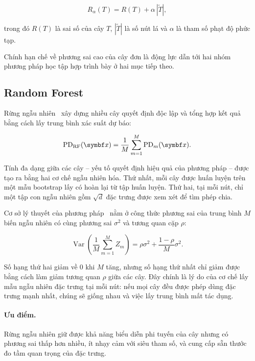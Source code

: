 \begin{equation}
R_\alpha(T) = R(T) + \alpha \, |\tilde{T}|,
\label{eq:ccp}
\end{equation}

trong đó $R(T)$ là sai số của cây $T$, $|\tilde{T}|$ là số nút lá và $\alpha$ là
tham số phạt độ phức tạp.

Chính hạn chế về phương sai cao của cây đơn là động lực dẫn tới hai nhóm phương
pháp học tập hợp trình bày ở hai mục tiếp theo.

\subsection{Random Forest}
\label{subsec:random-forest}

Rừng ngẫu nhiên~\cite{breiman2001} xây dựng nhiều cây quyết định độc lập và tổng
hợp kết quả bằng cách lấy trung bình xác suất dự báo:

\begin{equation}
\PD_{\text{RF}}(\bm{x}) = \frac{1}{M} \sum_{m=1}^{M} \PD_m(\bm{x}).
\label{eq:rf}
\end{equation}

Tính đa dạng giữa các cây -- yếu tố quyết định hiệu quả của phương pháp -- được
tạo ra bằng hai cơ chế ngẫu nhiên hóa. Thứ nhất, mỗi cây được huấn luyện trên một
mẫu bootstrap lấy có hoàn lại từ tập huấn luyện. Thứ hai, tại mỗi nút, chỉ một
tập con ngẫu nhiên gồm $\sqrt{d}$ đặc trưng được xem xét để tìm phép chia.

Cơ sở lý thuyết của phương pháp~\cite{hastie2009} nằm ở công thức phương sai của trung bình $M$
biến ngẫu nhiên có cùng phương sai $\sigma^2$ và tương quan cặp $\rho$:

\begin{equation}
\operatorname{Var}\!\left( \frac{1}{M}\sum_{m=1}^{M} Z_m \right)
= \rho \sigma^2 + \frac{1 - \rho}{M}\sigma^2.
\label{eq:rf-variance}
\end{equation}

Số hạng thứ hai giảm về 0 khi $M$ tăng, nhưng số hạng thứ nhất chỉ giảm được bằng
cách làm giảm tương quan $\rho$ giữa các cây. Đây chính là lý do của cơ chế lấy
mẫu ngẫu nhiên đặc trưng tại mỗi nút: nếu mọi cây đều được phép dùng đặc trưng
mạnh nhất, chúng sẽ giống nhau và việc lấy trung bình mất tác dụng.

\paragraph{Ưu điểm.} Rừng ngẫu nhiên giữ được khả năng biểu diễn phi tuyến của
cây nhưng có phương sai thấp hơn nhiều, ít nhạy cảm với siêu tham số, và cung cấp
sẵn thước đo tầm quan trọng của đặc trưng.


